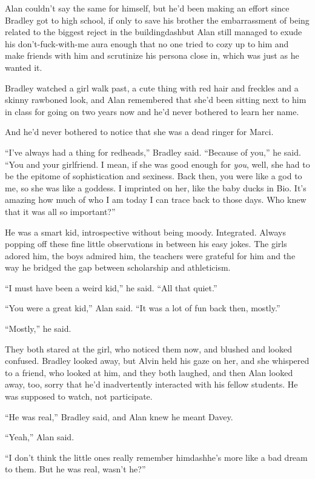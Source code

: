 Alan couldn't say the same for himself, but he'd been making an effort
since Bradley got to high school, if only to save his brother the
embarrassment of being related to the biggest reject in the
buildingdash{}but Alan still managed to exude his don't-fuck-with-me aura
enough that no one tried to cozy up to him and make friends with him
and scrutinize his persona close in, which was just as he wanted it.

Bradley watched a girl walk past, a cute thing with red hair and
freckles and a skinny rawboned look, and Alan remembered that she'd
been sitting next to him in class for going on two years now and he'd
never bothered to learn her name.

And he'd never bothered to notice that she was a dead ringer for
Marci.

``I've always had a thing for redheads,'' Bradley said.  ``Because of
you,'' he said.  ``You and your girlfriend.  I mean, if she was good
enough for \textit{you}, well, she had to be the epitome of
sophistication and sexiness.  Back then, you were like a god to me, so
she was like a goddess.  I imprinted on her, like the baby ducks in
Bio.  It's amazing how much of who I am today I can trace back to
those days.  Who knew that it was all so important?''

He was a smart kid, introspective without being moody.  Integrated. 
Always popping off these fine little observations in between his easy
jokes.  The girls adored him, the boys admired him, the teachers were
grateful for him and the way he bridged the gap between scholarship
and athleticism.

``I must have been a weird kid,'' he said.  ``All that quiet.''

``You were a great kid,'' Alan said.  ``It was a lot of fun back then,
mostly.''

``Mostly,'' he said.

They both stared at the girl, who noticed them now, and blushed and
looked confused.  Bradley looked away, but Alvin held his gaze on her,
and she whispered to a friend, who looked at him, and they both
laughed, and then Alan looked away, too, sorry that he'd inadvertently
interacted with his fellow students.  He was supposed to watch, not
participate.

``He was real,'' Bradley said, and Alan knew he meant Davey.

``Yeah,'' Alan said.

``I don't think the little ones really remember himdash{}he's more like a
bad dream to them.  But he was real, wasn't he?''

